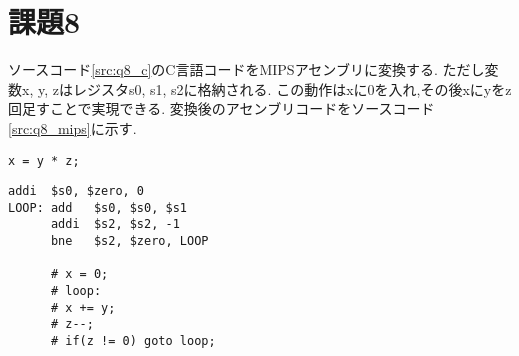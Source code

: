 \section{課題8}
ソースコード\ref{src:q8_c}のC言語コードをMIPSアセンブリに変換する.
ただし変数x, y, zはレジスタs0, s1, s2に格納される.
この動作はxに0を入れ,その後xにyをz回足すことで実現できる.
変換後のアセンブリコードをソースコード\ref{src:q8_mips}に示す.
\begin{lstlisting}[caption=C言語コード, label=src:q8_c]
x = y * z;
\end{lstlisting}
\begin{lstlisting}[caption=MIPSアセンブリコード, label=src:q8_mips]
      addi  $s0, $zero, 0
LOOP: add   $s0, $s0, $s1
      addi  $s2, $s2, -1 
      bne   $s2, $zero, LOOP

      # x = 0;
      # loop:
      # x += y;
      # z--;
      # if(z != 0) goto loop;
\end{lstlisting}